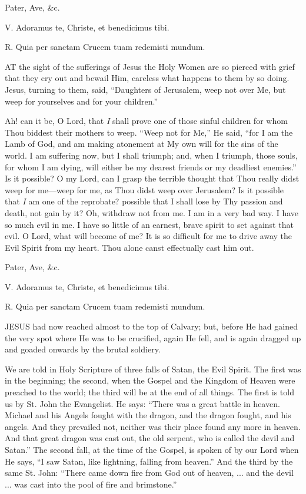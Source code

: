 Pater, Ave, \&c.


V. Adoramus te, Christe, et
benedicimus tibi.

R. Quia per sanctam Crucem tuam redemisti mundum.

AT the sight of the
sufferings of Jesus the Holy Women are so pierced with grief that they
cry out and bewail Him, careless what happens to them by so doing.
Jesus, turning to them, said, ``Daughters of Jerusalem, weep not over Me,
but weep for yourselves and for your children.''

Ah! can it be, O Lord, that \emph{I}
shall prove one of those sinful children for whom Thou biddest their
mothers to weep. ``Weep not for Me,'' He said, ``for I am the Lamb of God,
and am making atonement at My own will for the sins of the world. I am
suffering now, but I shall triumph; and, when I triumph, those souls,
for whom I am dying, will either be my dearest friends or my deadliest
enemies.'' Is it possible? O my Lord, can I grasp the terrible thought
that Thou really didst weep for me—weep for me, as Thou didst weep
over Jerusalem? Is it possible that \emph{I} am one of the reprobate?
possible that I shall lose by Thy passion and death, not gain by it? Oh,
withdraw not from me. I am in a very bad way. I have so much evil in me.
I have so little of an earnest, brave spirit to set against that evil. O
Lord, what will become of me? It is so difficult for me to drive away
the Evil Spirit from my heart. Thou alone canst effectually cast him
out.

Pater, Ave, \&c.


V. Adoramus te, Christe, et
benedicimus tibi.

R. Quia per sanctam Crucem tuam redemisti mundum.

JESUS had now reached
almost to the top of Calvary; but, before He had gained the very spot
where He was to be crucified, again He fell, and is again dragged up and
goaded onwards by the brutal soldiery.

We are told in Holy Scripture of
three falls of Satan, the Evil Spirit. The first was in the beginning;
the second, when the Gospel and the Kingdom of Heaven were preached to
the world; the third will be at the end of all things. The first is told
us by St. John the Evangelist. He says: ``There was a great battle in
heaven. Michael and his Angels fought with the dragon, and the dragon
fought, and his angels. And they prevailed not, neither was their place
found any more in heaven. And that great dragon was cast out, the old
serpent, who is called the devil and Satan.'' The second fall, at the
time of the Gospel, is spoken of by our Lord when He says, ``I saw Satan,
like lightning, falling from heaven.'' And the third by the same St.
John: ``There came down fire from God out of heaven, ... and the devil
... was cast into the pool of fire and brimstone.''

